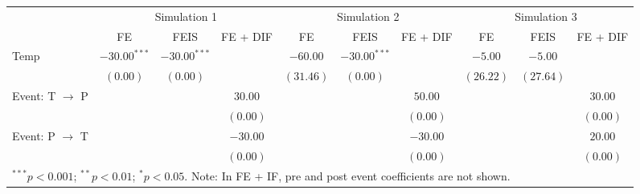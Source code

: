 
\begin{tabular}{l c c c c c c c c c}
\toprule
 & \multicolumn{3}{c}{Simulation 1} & \multicolumn{3}{c}{Simulation 2} & \multicolumn{3}{c}{Simulation 3} \\
\cmidrule(lr){2-4} \cmidrule(lr){5-7} \cmidrule(lr){8-10}
 & FE & FEIS & FE + DIF & FE & FEIS & FE + DIF & FE & FEIS & FE + DIF \\
\midrule
Temp                     & $-30.00^{***}$ & $-30.00^{***}$ &          & $-60.00$  & $-30.00^{***}$ &          & $-5.00$   & $-5.00$   &          \\
                         & $(0.00)$       & $(0.00)$       &          & $(31.46)$ & $(0.00)$       &          & $(26.22)$ & $(27.64)$ &          \\
Event: T $\rightarrow$ P &                &                & $30.00$  &           &                & $50.00$  &           &           & $30.00$  \\
                         &                &                & $(0.00)$ &           &                & $(0.00)$ &           &           & $(0.00)$ \\
Event: P $\rightarrow$ T &                &                & $-30.00$ &           &                & $-30.00$ &           &           & $20.00$  \\
                         &                &                & $(0.00)$ &           &                & $(0.00)$ &           &           & $(0.00)$ \\
\bottomrule
\multicolumn{10}{l}{\scriptsize{$^{***}p<0.001$; $^{**}p<0.01$; $^{*}p<0.05$. Note: In FE + IF, pre and post event coefficients are not shown.}}
\end{tabular}

